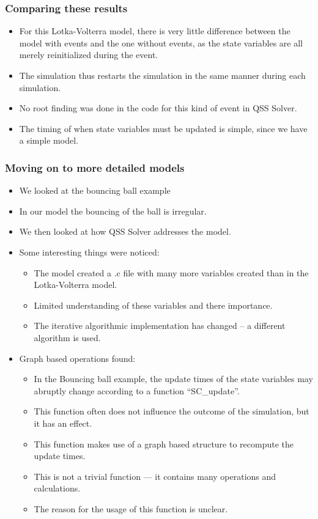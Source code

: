 \documentclass[serif,10pt,t]{beamer}
\begin{document}
\begin{frame}\frametitle{Comparing these results}
 \begin{itemize}
  \item For this Lotka-Volterra model, there is very little difference between the model with events and the one without events, as the state variables are all merely reinitialized during the event.
  \item The simulation thus restarts the simulation in the same manner during each simulation.
  \item No root finding was done in the code for this kind of event in QSS Solver.
  \item The timing of when state variables must be updated is simple, since  we have a simple model.
 \end{itemize}

\end{frame}



\begin{frame}\frametitle{Moving on to more detailed models}
 \begin{itemize}
  \item We looked at the bouncing ball example
  \item In our model the bouncing of the ball is irregular.
  \item We then looked at how QSS Solver addresses the model.
  \item Some interesting things were noticed:
  \begin{itemize}
   \item The model created a .c file with many more variables created than in the Lotka-Volterra model.
   \item Limited understanding of these variables and there importance.
   \item The iterative algorithmic implementation has changed -- a different algorithm is used.
  \end{itemize}
  \item Graph based operations found:
  \begin{itemize}
   \item In the Bouncing ball example, the update times of the state variables may abruptly change according to a function ``SC\_update''.
   \item This function often does not influence the outcome of the simulation, but it has an effect.
   \item This function makes use of a graph based structure to recompute the update times.
   \item This is not a trivial function --- it contains many operations and calculations.
   \item The reason for the usage of this function is unclear.
  \end{itemize}


 \end{itemize}

\end{frame}
\end{document}
